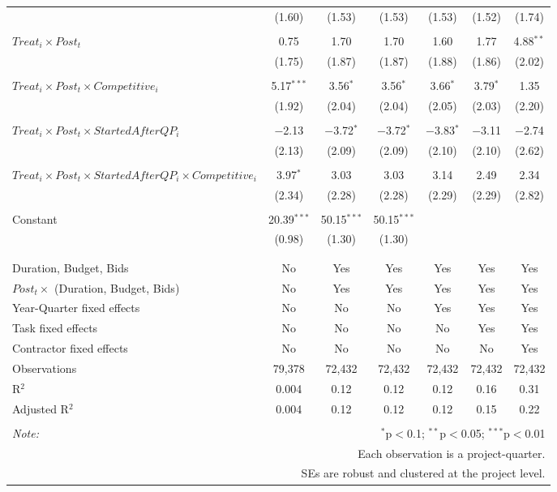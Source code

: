 \documentclass[
]{article}
\begin{document}
\begin{table}[H]
\begin{tabular}{@{\extracolsep{-3pt}}lcccccc}
  & (1.60) & (1.53) & (1.53) & (1.53) & (1.52) & (1.74) \\ 
  & & & & & & \\ 
 $Treat_i \times Post_t$ & 0.75 & 1.70 & 1.70 & 1.60 & 1.77 & 4.88$^{**}$ \\ 
  & (1.75) & (1.87) & (1.87) & (1.88) & (1.86) & (2.02) \\ 
  & & & & & & \\ 
 $Treat_i \times Post_t \times Competitive_i$ & 5.17$^{***}$ & 3.56$^{*}$ & 3.56$^{*}$ & 3.66$^{*}$ & 3.79$^{*}$ & 1.35 \\ 
  & (1.92) & (2.04) & (2.04) & (2.05) & (2.03) & (2.20) \\ 
  & & & & & & \\ 
 $Treat_i \times Post_t \times StartedAfterQP_i$ & $-$2.13 & $-$3.72$^{*}$ & $-$3.72$^{*}$ & $-$3.83$^{*}$ & $-$3.11 & $-$2.74 \\ 
  & (2.13) & (2.09) & (2.09) & (2.10) & (2.10) & (2.62) \\ 
  & & & & & & \\ 
 $Treat_i \times Post_t \times StartedAfterQP_i \times Competitive_i$ & 3.97$^{*}$ & 3.03 & 3.03 & 3.14 & 2.49 & 2.34 \\ 
  & (2.34) & (2.28) & (2.28) & (2.29) & (2.29) & (2.82) \\ 
  & & & & & & \\ 
 Constant & 20.39$^{***}$ & 50.15$^{***}$ & 50.15$^{***}$ &  &  &  \\ 
  & (0.98) & (1.30) & (1.30) &  &  &  \\ 
  & & & & & & \\ 
\hline \\[-1.8ex] 
Duration, Budget, Bids & No & Yes & Yes & Yes & Yes & Yes \\ 
$Post_t \times $  (Duration, Budget, Bids) & No & Yes & Yes & Yes & Yes & Yes \\ 
Year-Quarter fixed effects & No & No & No & Yes & Yes & Yes \\ 
Task fixed effects & No & No & No & No & Yes & Yes \\ 
Contractor fixed effects & No & No & No & No & No & Yes \\ 
Observations & 79,378 & 72,432 & 72,432 & 72,432 & 72,432 & 72,432 \\ 
R$^{2}$ & 0.004 & 0.12 & 0.12 & 0.12 & 0.16 & 0.31 \\ 
Adjusted R$^{2}$ & 0.004 & 0.12 & 0.12 & 0.12 & 0.15 & 0.22 \\ 
\hline 
\hline \\[-1.8ex] 
\textit{Note:}  & \multicolumn{6}{r}{$^{*}$p$<$0.1; $^{**}$p$<$0.05; $^{***}$p$<$0.01} \\ 
 & \multicolumn{6}{r}{Each observation is a project-quarter.} \\ 
 & \multicolumn{6}{r}{SEs are robust and clustered at the project level.} \\ 
\end{tabular} 
\end{table}
\end{document}
